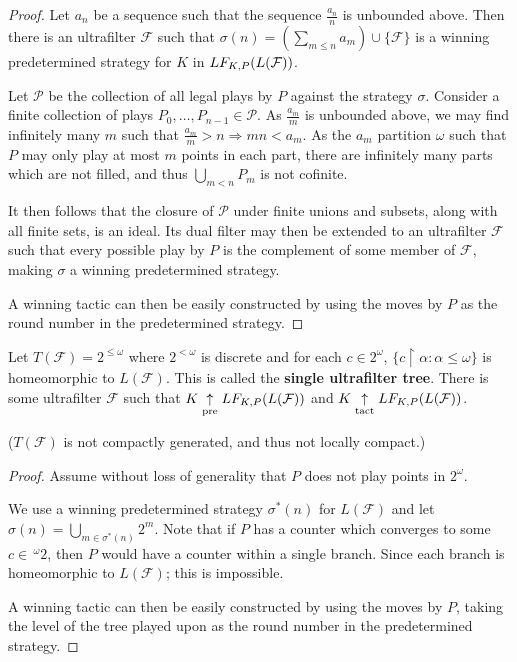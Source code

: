 \begin{proof}
Let $a_n$ be a sequence such that the sequence $\frac{a_n}{n}$ is unbounded above. Then there is an ultrafilter $\mathcal{F}$ such that $\sigma(n)=(\sum_{m\leq n} a_m )\cup \{\mathcal{F}\}$ is a winning predetermined strategy for $K$ in $LF_{K,P}(L(\mathcal{F}))$.

Let $\mathcal{P}$ be the collection of all legal plays by $P$ against the strategy $\sigma$. Consider a finite collection of plays $P_0,\dots,P_{n-1}\in \mathcal{P}$. As $\frac{a_m}{m}$ is unbounded above, we may find infinitely many $m$ such that $\frac{a_m}{m}>n \Rightarrow mn<a_m$. As the $a_m$ partition $\omega$ such that $P$ may only play at most $m$ points in each part, there are infinitely many parts which are not filled, and thus $\bigcup_{m<n} P_m$ is not cofinite.

It then follows that the closure of $\mathcal{P}$ under finite unions and subsets, along with all finite sets, is an ideal. Its dual filter may then be extended to an ultrafilter $\mathcal{F}$ such that every possible play by $P$ is the complement of some member of $\mathcal{F}$, making $\sigma$ a winning predetermined strategy.

A winning tactic can then be easily constructed by using the moves by $P$ as the round number in the predetermined strategy.
\end{proof}

\begin{ex}
Let $T(\mathcal{F}) = 2^{\leq\omega}$ where $2^{<\omega}$ is discrete and for each $c\in 2^\omega$, $\{c \restriction \alpha : \alpha \leq \omega\}$ is homeomorphic to $L(\mathcal{F})$. This is called the \textbf{single ultrafilter tree}. There is some ultrafilter $\mathcal{F}$ such that $K \underset{\text{pre}}{\uparrow} LF_{K,P}(L(\mathcal{F}))$ and $K \underset{\text{tact}}{\uparrow} LF_{K,P}(L(\mathcal{F}))$.

($T(\mathcal{F})$ is not compactly generated, and thus not locally compact.)
\end{ex}

\begin{proof}
Assume without loss of generality that $P$ does not play points in $2^\omega$.

We use a winning predetermined strategy $\sigma^*(n)$ for $L(\mathcal{F})$ and let $\sigma(n) = \bigcup_{m \in \sigma^*(n)} 2^m$. Note that if $P$ has a counter which converges to some $c\in \,^\omega2$, then $P$ would have a counter within a single branch. Since each branch is homeomorphic to $L(\mathcal{F})$; this is impossible.

A winning tactic can then be easily constructed by using the moves by $P$, taking the level of the tree played upon as the round number in the predetermined strategy.
\end{proof}

